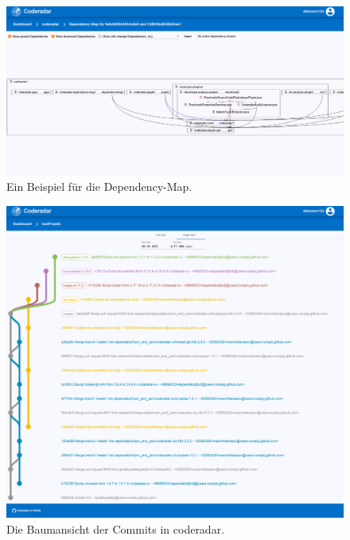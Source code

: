 \documentclass[
	oneside,  %
	ngerman, 
	final, 
	11pt, 
	a4paper, 
	1.1headlines, 
	headinclude=false, 
	footinclude=false, 
	mpinclude=false, 
	pagesize, 
	onecolumn, 
	titlepage, 
	parskip=half, 
	headsepline, 
	chapterprefix=false, 
	version=first, 
	listof=totoc, 
	bibliography=totoc, 
	toc=graduated, 
	fleqn
]{scrbook}
\begin{document}
\begin{figure}[htb]
	\begin{center}
		\includegraphics[width=\linewidth]{images/dependency_map}
		\caption{Ein Beispiel für die Dependency-Map.}
		\label{dependency_map}
	\end{center}
\end{figure}

\begin{figure}[htb]
	\begin{center}
		\includegraphics[width=\linewidth]{images/tree_view}
		\caption{Die Baumansicht der Commits in coderadar.}
		\label{tree_view}
	\end{center}
\end{figure}
\end{document}
